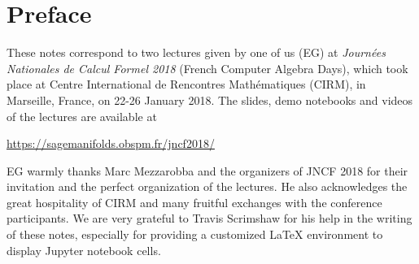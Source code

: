 \section*{Preface}
These notes correspond to two lectures given by one of us (EG)
at \emph{Journées Nationales de Calcul Formel 2018}  (French Computer Algebra Days),
which took place at Centre International de Rencontres Mathématiques (CIRM),
in Marseille, France, on 22-26 January 2018.
The slides, demo
notebooks and videos of the lectures are available at
\begin{center}
\url{https://sagemanifolds.obspm.fr/jncf2018/}
\end{center}

EG warmly thanks Marc Mezzarobba and the organizers of JNCF 2018 for their
invitation and the perfect organization of the lectures. He also acknowledges
the great hospitality of CIRM and many fruitful exchanges with the conference
participants. We are very grateful to Travis Scrimshaw for his help in the
writing of these notes, especially for providing a customized \LaTeX{} environment
to display Jupyter notebook cells.
